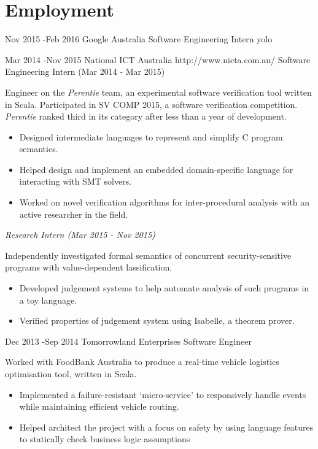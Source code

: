 \documentclass[10pt]{article} %
\begin{document}

\section{Employment}

\job
{Nov 2015 -}{Feb 2016}
{Google Australia}
{}
{Software Engineering Intern}
{yolo}

\newpage

\job
{Mar 2014 -}{Nov 2015}
{National ICT Australia}
{http://www.nicta.com.au/}
{Software Engineering Intern (Mar 2014 - Mar 2015)}
{Engineer on the \textit{Perentie} team, an experimental software verification tool written in Scala. Participated in SV COMP 2015, a software verification competition. \textit{Perentie} ranked third in its category after less than a year of development.

\begin{itemize} \itemsep-1pt
 \item{Designed intermediate languages to represent and simplify C program semantics.}
 \item{Helped design and implement an embedded domain-specific language for interacting with SMT solvers.}
 \item{Worked on novel verification algorithms for inter-procedural analysis with an active researcher in the field.}
\end{itemize}

\textit{Research Intern (Mar 2015 - Nov 2015)} \vspace{2mm}

Independently investigated formal semantics of concurrent security-sensitive programs with value-dependent lassification.

\begin{itemize} \itemsep-1pt
 \item{Developed judgement systems to help automate analysis of such programs in a toy language.}
 \item{Verified properties of judgement system using Isabelle, a theorem prover.} 
\end{itemize}

}

\job
{Dec 2013 -}{Sep 2014}
{Tomorrowland Enterprises}
{}
{Software Engineer}
{Worked with FoodBank Australia to produce a real-time vehicle logistics optimisation tool, written in Scala.

\begin{itemize} \itemsep-1pt
 \item{Implemented a failure-resistant `micro-service' to responsively handle events while maintaining efficient vehicle routing.}
 \item{Helped architect the project with a focus on safety by using language features to statically check business logic assumptions} 
\end{itemize}
}
\end{document}
